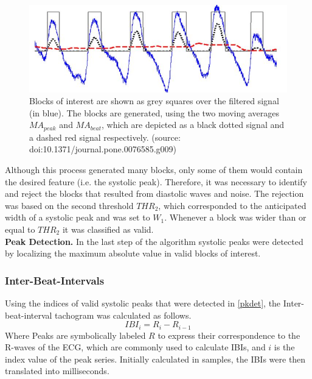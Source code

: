 \begin{figure}[h!]
	\centering
  \includegraphics[width=1.0\textwidth, angle=0]{images/bvp_dta.jpg}
	\caption[Peak Detection Algorithm]{Blocks of interest are shown as grey squares over the filtered signal (in blue). The blocks are generated, using the two moving averages $MA_{peak}$ and $MA_{beat}$, which are depicted as a black dotted signal and a dashed red signal respectively. (source: doi:10.1371/journal.pone.0076585.g009)}
	\label{bvp_dta}
\end{figure}

Although this process generated many blocks, only some of them would contain the desired feature (i.e. the systolic peak). Therefore, it was necessary to identify and reject the blocks that resulted from diastolic waves and noise. The rejection was based on the second threshold $THR_{2}$, which corresponded to the anticipated width of a systolic peak and was set to $W_{1}$. Whenever a block was wider than or equal to $THR_{2}$ it was classified as valid.\\
\textbf{Peak Detection.}\label{pkdet} In the last step of the algorithm systolic peaks were detected by localizing the maximum absolute value in valid blocks of interest. 

\subsubsection{Inter-Beat-Intervals}
Using the indices of valid systolic peaks that were detected in \ref{pkdet}, the Inter-beat-interval tachogram was calculated as follows.
\begin{equation}
IBI_{i} = R_{i}-R_{i-1}
\end{equation}
Where Peaks are symbolically labeled $R$ to express their correspondence to the R-waves of the ECG, which are commonly used to calculate IBIs, and $i$ is the index value of the peak series.
Initially calculated in samples, the IBIs were then translated into milliseconds.

